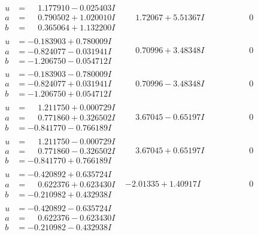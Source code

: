 \documentclass[1p]{elsarticle_modified}
\theoremstyle{definition}
\begin{document}
$$\begin{array}{c|c|c}
\begin{aligned}
u &= \phantom{-}1.177910 - 0.025403 I \\
a &= \phantom{-}0.790502 + 1.020010 I \\
b &= \phantom{-}0.365064 + 1.132200 I\end{aligned}
 & \phantom{-}1.72067 + 5.51367 I & \phantom{-0.000000 } 0 \\ \hline\begin{aligned}
u &= -0.183903 + 0.780009 I \\
a &= -0.824077 - 0.031941 I \\
b &= -1.206750 - 0.054712 I\end{aligned}
 & \phantom{-}0.70996 + 3.48348 I & \phantom{-0.000000 } 0 \\ \hline\begin{aligned}
u &= -0.183903 - 0.780009 I \\
a &= -0.824077 + 0.031941 I \\
b &= -1.206750 + 0.054712 I\end{aligned}
 & \phantom{-}0.70996 - 3.48348 I & \phantom{-0.000000 } 0 \\ \hline\begin{aligned}
u &= \phantom{-}1.211750 + 0.000729 I \\
a &= \phantom{-}0.771860 + 0.326502 I \\
b &= -0.841770 - 0.766189 I\end{aligned}
 & \phantom{-}3.67045 - 0.65197 I & \phantom{-0.000000 } 0 \\ \hline\begin{aligned}
u &= \phantom{-}1.211750 - 0.000729 I \\
a &= \phantom{-}0.771860 - 0.326502 I \\
b &= -0.841770 + 0.766189 I\end{aligned}
 & \phantom{-}3.67045 + 0.65197 I & \phantom{-0.000000 } 0 \\ \hline\begin{aligned}
u &= -0.420892 + 0.635724 I \\
a &= \phantom{-}0.622376 + 0.623430 I \\
b &= -0.210982 + 0.432938 I\end{aligned}
 & -2.01335 + 1.40917 I & \phantom{-0.000000 } 0 \\ \hline\begin{aligned}
u &= -0.420892 - 0.635724 I \\
a &= \phantom{-}0.622376 - 0.623430 I \\
b &= -0.210982 - 0.432938 I\end{aligned}

\end{array}$$
\end{document}
